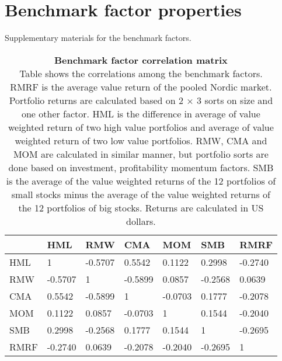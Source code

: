 \documentclass{article}
\begin{document}
\section{Benchmark factor properties} \label{BenchmarkFactorProperties}
\renewcommand{\thefigure}{B.\arabic{figure}}
\setcounter{figure}{0}
\renewcommand{\thetable}{B.\arabic{table}}
\setcounter{table}{0}

Supplementary materials for the benchmark factors. 

\begin{table}[ht]
\small
\caption[Benchmark factor correlation matrix]{\textbf{Benchmark factor correlation matrix}\\ Table shows the correlations among the benchmark factors. RMRF is the average value return of the pooled Nordic market. Portfolio returns are calculated based on 2 × 3 sorts on size and one other factor. HML is the difference in average of value weighted return of two high value portfolios and average of value weighted return of two low value portfolios. RMW, CMA and MOM are calculated in similar manner, but portfolio sorts are done based on investment, profitability momentum factors. SMB is the average of the value weighted returns of the 12 portfolios of small stocks minus the average of the value weighted returns of the 12 portfolios of big stocks. Returns are calculated in US dollars.}
\label{table:FFfactorsCorrelations}
\centering
{}
\begin{tabularx}{\textwidth}{@{\extracolsep{4pt}} X Y Y Y Y Y Y} 
\toprule
& HML & RMW & CMA & MOM & SMB & RMRF \\
\midrule
HML & 1 & -0.5707 & 0.5542 & 0.1122 & 0.2998 & -0.2740 \\
RMW & -0.5707 & 1 & -0.5899 & 0.0857 & -0.2568 & 0.0639 \\
CMA & 0.5542 & -0.5899 & 1 & -0.0703 & 0.1777 & -0.2078 \\
MOM & 0.1122 & 0.0857 & -0.0703 & 1 & 0.1544 & -0.2040 \\
SMB & 0.2998 & -0.2568 & 0.1777 & 0.1544 & 1 & -0.2695 \\
RMRF & -0.2740 & 0.0639 & -0.2078 & -0.2040 & -0.2695 & 1 \\
\bottomrule
\end{tabularx}
\end{table}
\end{document}
